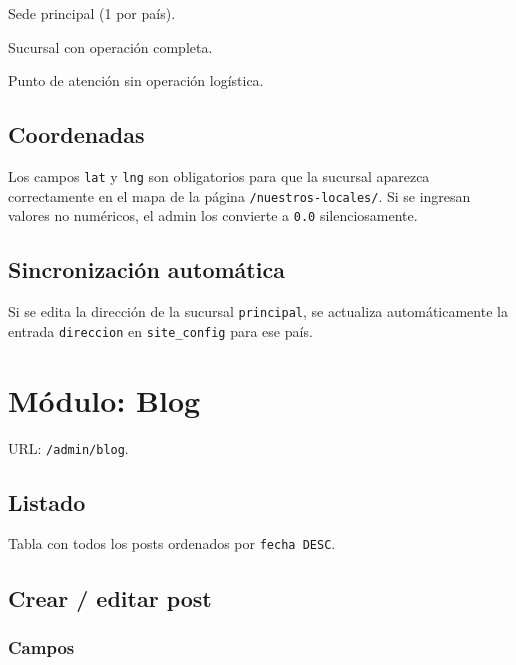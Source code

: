 \documentclass[11pt,a4paper]{article}
\begin{document}
\begin{description}[leftmargin=*]
    \item[\texttt{principal}] Sede principal (1 por país).
    \item[\texttt{sucursal}] Sucursal con operación completa.
    \item[\texttt{atención}] Punto de atención sin operación logística.
\end{description}

\subsection{Coordenadas}

Los campos \texttt{lat} y \texttt{lng} son obligatorios para que la
sucursal aparezca correctamente en el mapa de la página
\texttt{/nuestros-locales/}. Si se ingresan valores no numéricos, el
admin los convierte a \texttt{0.0} silenciosamente.

\subsection{Sincronización automática}

Si se edita la dirección de la sucursal \texttt{principal}, se actualiza
automáticamente la entrada \texttt{direccion} en \texttt{site\_config}
para ese país.

\section{Módulo: Blog}

URL: \texttt{/admin/blog}.

\subsection{Listado}

Tabla con todos los posts ordenados por \texttt{fecha DESC}.

\subsection{Crear / editar post}

\subsubsection{Campos}
\end{document}
